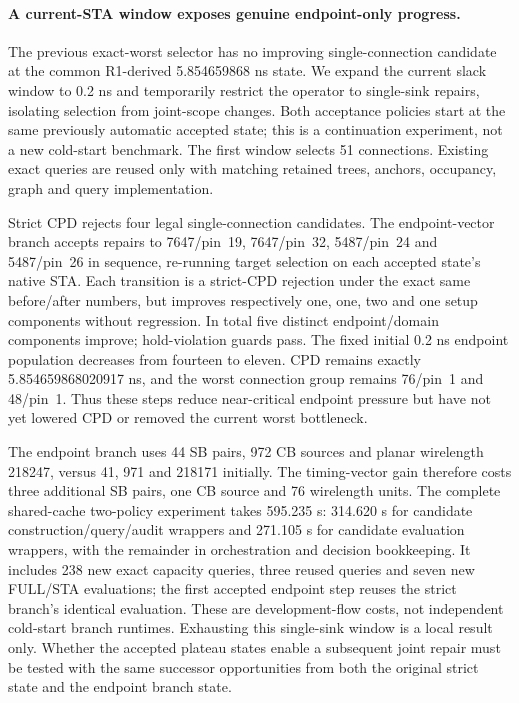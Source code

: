 \paragraph{A current-STA window exposes genuine endpoint-only progress.}
The previous exact-worst selector has no improving single-connection candidate at the common R1-derived 5.854659868 ns state. We expand the current slack window to 0.2 ns and temporarily restrict the operator to single-sink repairs, isolating selection from joint-scope changes. Both acceptance policies start at the same previously automatic accepted state; this is a continuation experiment, not a new cold-start benchmark. The first window selects 51 connections. Existing exact queries are reused only with matching retained trees, anchors, occupancy, graph and query implementation.

Strict CPD rejects four legal single-connection candidates. The endpoint-vector branch accepts repairs to 7647/pin~19, 7647/pin~32, 5487/pin~24 and 5487/pin~26 in sequence, re-running target selection on each accepted state's native STA. Each transition is a strict-CPD rejection under the exact same before/after numbers, but improves respectively one, one, two and one setup components without regression. In total five distinct endpoint/domain components improve; hold-violation guards pass. The fixed initial 0.2 ns endpoint population decreases from fourteen to eleven. CPD remains exactly 5.854659868020917 ns, and the worst connection group remains 76/pin~1 and 48/pin~1. Thus these steps reduce near-critical endpoint pressure but have not yet lowered CPD or removed the current worst bottleneck.

The endpoint branch uses 44 SB pairs, 972 CB sources and planar wirelength 218247, versus 41, 971 and 218171 initially. The timing-vector gain therefore costs three additional SB pairs, one CB source and 76 wirelength units. The complete shared-cache two-policy experiment takes 595.235 s: 314.620 s for candidate construction/query/audit wrappers and 271.105 s for candidate evaluation wrappers, with the remainder in orchestration and decision bookkeeping. It includes 238 new exact capacity queries, three reused queries and seven new FULL/STA evaluations; the first accepted endpoint step reuses the strict branch's identical evaluation. These are development-flow costs, not independent cold-start branch runtimes. Exhausting this single-sink window is a local result only. Whether the accepted plateau states enable a subsequent joint repair must be tested with the same successor opportunities from both the original strict state and the endpoint branch state.

